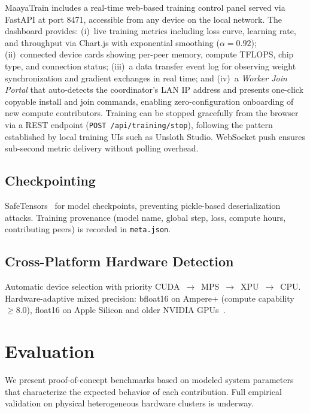 \documentclass[10pt,conference]{IEEEtran}
\begin{document}
MaayaTrain includes a real-time web-based training control panel served via
FastAPI at port 8471, accessible from any device on the local network. The
dashboard provides: (i)~live training metrics including loss curve, learning
rate, and throughput via Chart.js with exponential smoothing
($\alpha{=}0.92$); (ii)~connected device cards showing per-peer memory,
compute TFLOPS, chip type, and connection status; (iii)~a data transfer
event log for observing weight synchronization and gradient exchanges in
real time; and (iv)~a \emph{Worker Join Portal} that auto-detects the
coordinator's LAN IP address and presents one-click copyable install and
join commands, enabling zero-configuration onboarding of new compute
contributors. Training can be stopped gracefully from the browser via a
REST endpoint (\texttt{POST /api/training/stop}), following the pattern
established by local training UIs such as Unsloth Studio. WebSocket
push ensures sub-second metric delivery without polling overhead.

\subsection{Checkpointing}

SafeTensors~\cite{safetensors2023} for model checkpoints, preventing
pickle-based deserialization attacks. Training provenance (model name, global
step, loss, compute hours, contributing peers) is recorded in
\texttt{meta.json}.

\subsection{Cross-Platform Hardware Detection}

Automatic device selection with priority CUDA~$\to$~MPS~$\to$~XPU~$\to$~CPU.
Hardware-adaptive mixed precision: bfloat16 on Ampere+ (compute capability
$\geq 8.0$), float16 on Apple Silicon and older NVIDIA
GPUs~\cite{micikevicius2018mixed,kalamkar2019bf16}.


\section{Evaluation}
\label{sec:evaluation}

We present proof-of-concept benchmarks based on modeled system parameters
that characterize the expected behavior of each contribution. Full empirical
validation on physical heterogeneous hardware clusters is underway.
\end{document}
